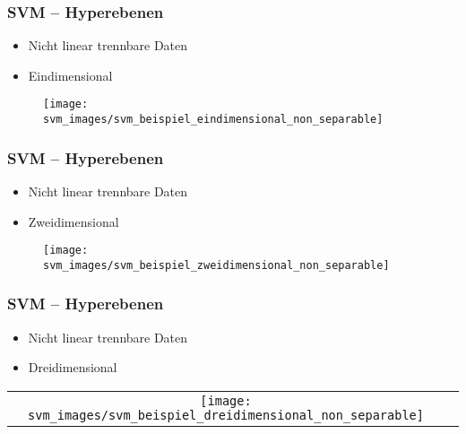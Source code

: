 \begin{frame}

\frametitle{SVM -- Hyperebenen}

\begin{itemize}
	\setlength{\itemsep}{5pt}
	\item Nicht linear trennbare Daten
	\item Eindimensional
\end{itemize}

\vspace{15pt}

\begin{figure}[h]
\centering
\texttt{[image: svm\_images/svm\_beispiel\_eindimensional\_non\_separable]}
\end{figure}

\end{frame}







\begin{frame}

\frametitle{SVM -- Hyperebenen}

\begin{itemize}
	\setlength{\itemsep}{5pt}
	\item Nicht linear trennbare Daten
	\item Zweidimensional
\end{itemize}

\vspace{3pt}

\begin{figure}[h]
\centering
\texttt{[image: svm\_images/svm\_beispiel\_zweidimensional\_non\_separable]}
\end{figure}

\end{frame}







\begin{frame}

\frametitle{SVM -- Hyperebenen}

\begin{itemize}
	\setlength{\itemsep}{5pt}
	\item Nicht linear trennbare Daten
	\item Dreidimensional
\end{itemize}

\vspace{3pt}

\center
\begin{tabular}[h]{cl}
\texttt{[image: svm\_images/svm\_beispiel\_dreidimensional\_non\_separable]} &  {\tiny \cite{svmsuccinctly}}
\end{tabular}

\end{frame}






